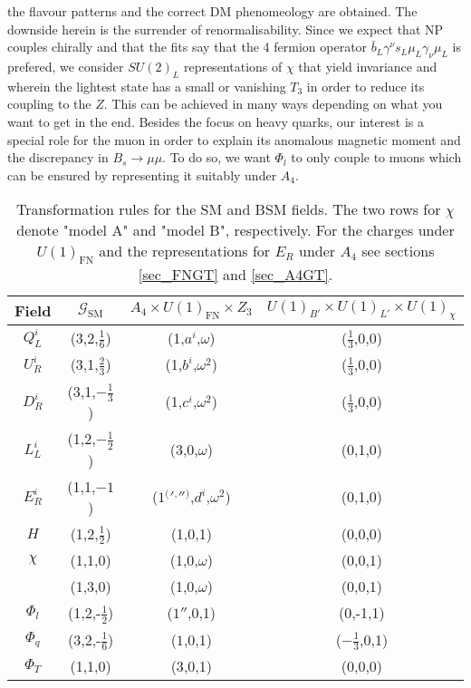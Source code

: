 the flavour patterns and the correct DM phenomeology are obtained. 
The downside herein is the surrender of renormalisability. Since we expect that NP couples chirally and that the fits say that the 4 fermion operator 
$\bar b_L \gamma^\nu s_L \mu_L \gamma_\nu \mu_L$ is prefered, we consider $SU(2)_L$ representations of $\chi$ that yield invariance and wherein the lightest
state has a small or vanishing $T_3$ in order to reduce its coupling to the $Z$. This can be achieved in many ways depending on what you want to get in the end. Besides the focus on heavy quarks,
our interest is a special role for the muon in order to explain its anomalous magnetic moment and the discrepancy in $B_s\rightarrow \mu\mu$. 
To do so, we want $\Phi_l$ to only couple to muons which can be ensured by representing it suitably under $A_4$. 
\begin{table}[t]
 \begin{tabular}{c|c|c|c}
  Field & $\mathcal{G}_\text{SM}$ & $A_4 \times U(1)_\text{FN} \times Z_3$ & $U(1)_{B'}\times U(1)_{L'}\times U(1)_\chi$\\
  \hline
  $Q^i_L$ & (3,2,$\frac16$) & (1,$a^i$,$\omega$) & ($\frac13$,0,0)\\
  $U^i_R$ & (3,1,$\frac23$) & (1,$b^i$,$\omega^2$)& ($\frac13$,0,0)\\
  $D^i_R$ & (3,1,$-\frac13$) & (1,$c^i$,$\omega^2$)& ($\frac13$,0,0)\\
  $L^i_L$ & (1,2,$-\frac12$) & (3,0,$\omega$)& (0,1,0)\\
  $E^i_R$ & (1,1,$-1$) & ($1 {^(} {'} {^,} '' {^)} $,$d^i$,$\omega^2$)& (0,1,0)\\
  $H$ & (1,2,$\frac12$) & (1,0,1)& (0,0,0)\\
  \hline
  $\chi$ & (1,1,0) & (1,0,$\omega$)& (0,0,1)\\ %
 & (1,3,0) & (1,0,$\omega$)&(0,0,1)\\
  $\Phi_l$ & (1,2,-$\frac12$) & ($1''$,0,1)& (0,-1,1)\\
  $\Phi_q$ & (3,2,-$\frac16$) & ($1$,0,1)& ($-\frac13$,0,1)\\
  \hline
  $\Phi_T$ & (1,1,0) & ($3$,0,1)& (0,0,0)\\
 \end{tabular}
\caption{Transformation rules for the SM and BSM fields. The two rows for $\chi$ denote "model A" and "model B", respectively. For the charges under $U(1)_\text{FN}$ and the representations for $E_R$ under $A_4$ 
see sections \ref{sec_FNGT} and \ref{sec_A4GT}.}
\label{tab_models}
\end{table}
